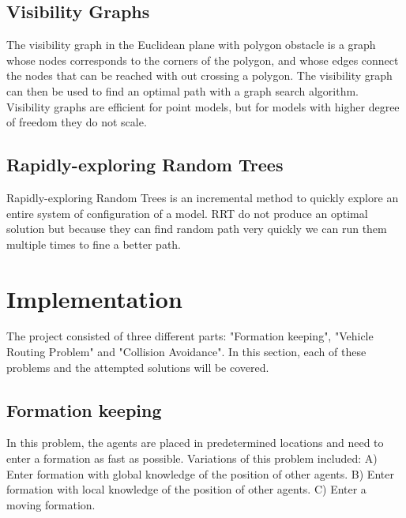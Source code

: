 \documentclass[a4paper,12pt]{article}
\begin{document}
\subsection{}
\label{sec:mm}

\subsection{Visibility Graphs} 
\label{sec:vg}
The visibility graph\cite{945797} in the Euclidean plane with polygon obstacle is a graph whose nodes corresponds to the corners of the polygon, and whose edges connect the nodes that can be reached with out crossing a polygon. The visibility graph can then be used to find an optimal path with a graph search algorithm. Visibility graphs are efficient for point models, but for models with higher degree of freedom they do not scale. 

 
\subsection{Rapidly-exploring Random Trees} 
\label{sec:rrt}
Rapidly-exploring Random Trees \cite{lavalle1998rapidly} is an incremental method to quickly explore an entire system of configuration of a model. RRT do not produce an optimal solution but because they can find random path very quickly we can run them multiple times to fine a better path.  

\subsection{}
\label{sec:pp}

\section{Implementation}
\label{sec:method}
The project consisted of three different parts: "Formation keeping", "Vehicle Routing Problem" and "Collision Avoidance". In this section, each of these problems and the attempted solutions will be covered.  
\subsection{Formation keeping}
\label{sec:mmImpl}
In this problem, the agents are placed in predetermined locations and need to enter a formation as fast as possible. Variations of this problem included:
A) Enter formation with global knowledge of the position of other agents.
B) Enter formation with local knowledge of the position of other agents.
C) Enter a moving formation.
\end{document}
